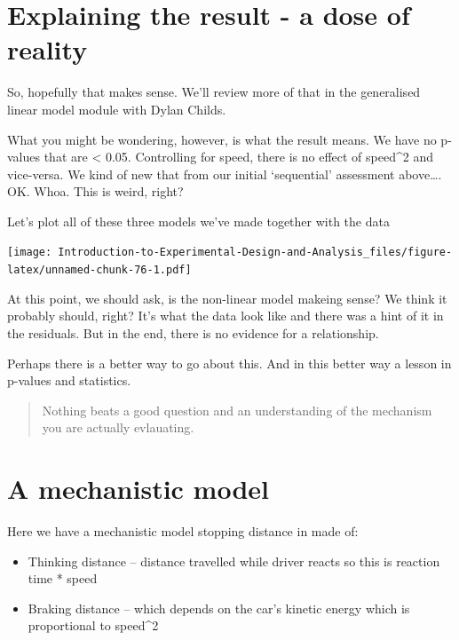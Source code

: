 \documentclass[
]{book}
\providecommand{\tightlist}{%
  \setlength{\itemsep}{0pt}\setlength{\parskip}{0pt}}
\begin{document}
\hypertarget{explaining-the-result---a-dose-of-reality}{%
\section{Explaining the result - a dose of reality}\label{explaining-the-result---a-dose-of-reality}}

So, hopefully that makes sense. We'll review more of that in the generalised linear model module with Dylan Childs.

What you might be wondering, however, is what the result means. We have no p-values that are \textless{} 0.05. Controlling for speed, there is no effect of speed\^{}2 and vice-versa. We kind of new that from our initial `sequential' assessment above\ldots.
OK. Whoa. This is weird, right?

Let's plot all of these three models we've made together with the data

\texttt{[image: Introduction-to-Experimental-Design-and-Analysis\_files/figure-latex/unnamed-chunk-76-1.pdf]}

At this point, we should ask, is the non-linear model makeing sense? We think it probably should, right? It's what the data look like and there was a hint of it in the residuals. But in the end, there is no evidence for a relationship.

Perhaps there is a better way to go about this. And in this better way a lesson in p-values and statistics.

\begin{quote}
Nothing beats a good question and an understanding of the mechanism you are actually evlauating.
\end{quote}

\hypertarget{a-mechanistic-model}{%
\section{A mechanistic model}\label{a-mechanistic-model}}

Here we have a mechanistic model stopping distance in made of:

\begin{itemize}
\tightlist
\item
  Thinking distance -- distance travelled while driver reacts so this is reaction time * speed
\item
  Braking distance -- which depends on the car's kinetic energy which is proportional to speed\^{}2
\end{itemize}
\end{document}
